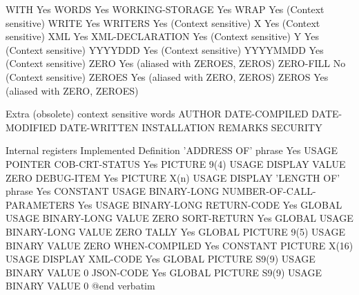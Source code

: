 WITH                            Yes
WORDS                           Yes
WORKING-STORAGE                 Yes
WRAP                            Yes (Context sensitive)
WRITE                           Yes
WRITERS                         Yes (Context sensitive)
X                               Yes (Context sensitive)
XML                             Yes
XML-DECLARATION                 Yes (Context sensitive)
Y                               Yes (Context sensitive)
YYYYDDD                         Yes (Context sensitive)
YYYYMMDD                        Yes (Context sensitive)
ZERO                            Yes (aliased with ZEROES, ZEROS)
ZERO-FILL                       No (Context sensitive)
ZEROES                          Yes (aliased with ZERO, ZEROS)
ZEROS                           Yes (aliased with ZERO, ZEROES)

Extra (obsolete) context sensitive words
AUTHOR
DATE-COMPILED
DATE-MODIFIED
DATE-WRITTEN
INSTALLATION
REMARKS
SECURITY

Internal registers              Implemented     Definition
'ADDRESS OF' phrase             Yes             USAGE POINTER
COB-CRT-STATUS                  Yes             PICTURE 9(4) USAGE DISPLAY VALUE ZERO
DEBUG-ITEM                      Yes             PICTURE X(n) USAGE DISPLAY
'LENGTH OF' phrase              Yes             CONSTANT USAGE BINARY-LONG
NUMBER-OF-CALL-PARAMETERS       Yes             USAGE BINARY-LONG
RETURN-CODE                     Yes             GLOBAL USAGE BINARY-LONG VALUE ZERO
SORT-RETURN                     Yes             GLOBAL USAGE BINARY-LONG VALUE ZERO
TALLY                           Yes             GLOBAL PICTURE 9(5) USAGE BINARY VALUE ZERO
WHEN-COMPILED                   Yes             CONSTANT PICTURE X(16) USAGE DISPLAY
XML-CODE                        Yes             GLOBAL PICTURE S9(9) USAGE BINARY VALUE 0
JSON-CODE                       Yes             GLOBAL PICTURE S9(9) USAGE BINARY VALUE 0
@end verbatim
